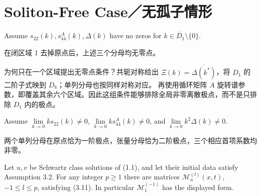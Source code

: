 \section{Soliton-Free Case／无孤子情形}
\begin{paperassumptionen}
Assume $s_{22}(k),s_{44}^A(k),\Delta(k)$ have no zeros for $k\in\overline D_1\setminus\{0\}$.
\end{paperassumptionen}
\begin{paperassumptioncn*}
在闭区域 1 去掉原点后，上述三个分母均无零点。
\end{paperassumptioncn*}
\begin{note}
为何只在一个区域提出无零点条件？共轭对称给出 $\Xi(k)=\overline{\Delta(k^*)}$，将 $D_1$ 的二阶子式映到 $D_8$；单列分母也按同样对称对应。
再使用循环矩阵 $A$ 旋转谱参数，即覆盖其余六个区域。因此这组条件能够排除全局非零离散极点，而不是只排除 $D_1$ 内的极点。
\end{note}
\begin{paperassumptionen}
Assume $\displaystyle\lim\limits_{k\to0}ks_{22}(k)\ne0$, $\displaystyle\lim\limits_{k\to0}ks_{44}^A(k)\ne0$, and $\displaystyle\lim\limits_{k\to0}k^2\Delta(k)\ne0$.
\end{paperassumptionen}
\begin{paperassumptioncn*}
两个单列分母在原点恰为一阶极点，张量分母恰为二阶极点，三个相应首项系数均非零。
\end{paperassumptioncn*}
\begin{note}
\end{note}
\begin{paperlemmaen}
Let $u,v$ be Schwartz class solutions of (1.1), and let their initial data satisfy Assumption 3.2. For any integer $p\geq1$ there are matrices $\mathcal M_n^{(l)}(x,t)$, $-1\leq l\leq p$, satisfying (3.11). In particular $\mathcal M_1^{(-1)}$ has the displayed form.
\end{paperlemmaen}
